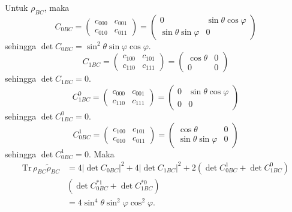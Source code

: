 Untuk $\rho_{BC}$, maka
\begin{equation}
	C_{0BC}=
	\begin{pmatrix}
		c_{000} & c_{001} \\
		c_{010} & c_{011}
	\end{pmatrix}=
	\begin{pmatrix}
		0 & \sin\theta\cos\varphi \\
		\sin\theta\sin\varphi & 0
	\end{pmatrix}
\end{equation}
sehingga $\det C_{0BC} = \sin^2\theta\sin\varphi\cos\varphi$.
\begin{equation}
	C_{1BC}=
	\begin{pmatrix}
		c_{100} & c_{101} \\
		c_{110} & c_{111}
	\end{pmatrix}=
	\begin{pmatrix}
		\cos\theta & 0 \\
		0 & 0
	\end{pmatrix}
\end{equation}
sehingga $\det C_{1BC} = 0$.
\begin{equation}
	C_{1BC}^0=
	\begin{pmatrix}
		c_{000} & c_{001} \\
		c_{110} & c_{111}
	\end{pmatrix}=
	\begin{pmatrix}
		0 & \sin\theta\cos\varphi \\
		0 & 0
	\end{pmatrix}
\end{equation}
sehingga $\det C_{1BC}^0 = 0$.
\begin{equation}
	C_{0BC}^1=
	\begin{pmatrix}
		c_{100} & c_{101} \\
		c_{010} & c_{011}
	\end{pmatrix}=
	\begin{pmatrix}
		\cos\theta & 0 \\
		\sin\theta\sin\varphi & 0
	\end{pmatrix}
\end{equation}
sehingga $\det C_{0BC}^1 = 0$. Maka
\begin{equation}
	\begin{aligned}
		\mathrm{Tr}\,\rho_{BC}\tilde{\rho}_{BC}
		&=4 |\det C_{0BC}|^2+ 4 |\det C_{1BC}|^2+ 2 (\det C_{0BC}^1 + \det C_{1BC}^0)\\
		&(\det C^{*1}_{0BC} + \det C^{*0}_{1BC})\\
		&=4\sin^4\theta \sin^2\varphi\cos^2\varphi.
	\end{aligned}
\end{equation}

